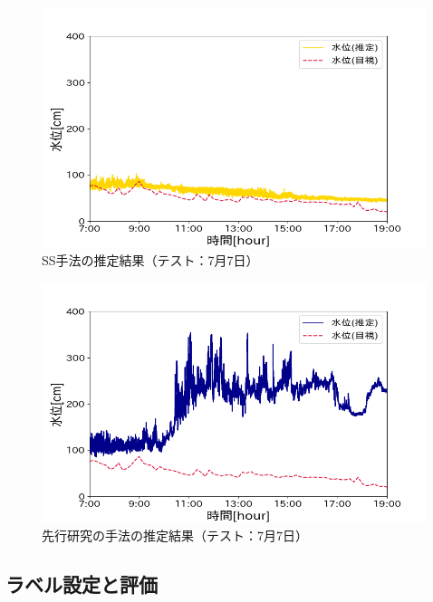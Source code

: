 \begin{figure}[h] 
  \begin{center}
    \includegraphics[width=\linewidth]{image/0707_ss.png}
  \end{center}
  \caption{SS手法の推定結果（テスト：7月7日）}
  \label{ss_0707}
\end{figure}

\begin{figure}[h] 
  \begin{center}
    \includegraphics[width=\linewidth]{image/0707_senkou.png}
  \end{center}
  \caption{先行研究の手法の推定結果（テスト：7月7日）}
  \label{senkou_0707}
\end{figure}



\clearpage
\subsection{ラベル設定と評価}
\label{5.3}

